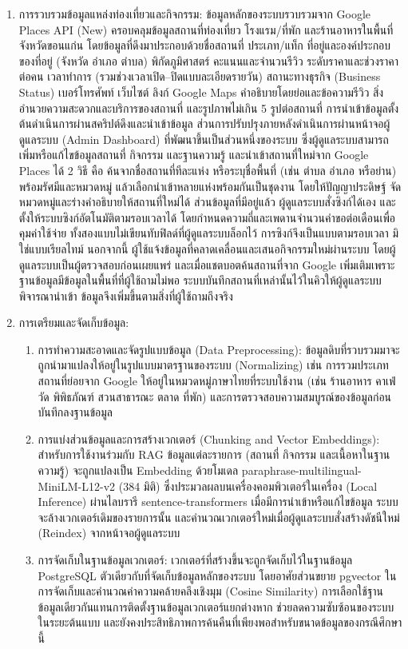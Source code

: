 \begin{enumerate}
\item การรวบรวมข้อมูลแหล่งท่องเที่ยวและกิจกรรม: ข้อมูลหลักของระบบรวบรวมจาก Google Places API (New) ครอบคลุมข้อมูลสถานที่ท่องเที่ยว โรงแรม/ที่พัก และร้านอาหารในพื้นที่จังหวัดขอนแก่น โดยข้อมูลที่ดึงมาประกอบด้วยชื่อสถานที่ ประเภท/แท็ก ที่อยู่และองค์ประกอบของที่อยู่ (จังหวัด อำเภอ ตำบล) พิกัดภูมิศาสตร์ คะแนนและจำนวนรีวิว ระดับราคาและช่วงราคาต่อคน เวลาทำการ (รวมช่วงเวลาเปิด--ปิดแบบละเอียดรายวัน) สถานะทางธุรกิจ (Business Status) เบอร์โทรศัพท์ เว็บไซต์ ลิงก์ Google Maps คำอธิบายโดยย่อและข้อความรีวิว สิ่งอำนวยความสะดวกและบริการของสถานที่ และรูปภาพไม่เกิน 5 รูปต่อสถานที่ การนำเข้าข้อมูลตั้งต้นดำเนินการผ่านสคริปต์ดึงและนำเข้าข้อมูล ส่วนการปรับปรุงภายหลังดำเนินการผ่านหน้าจอผู้ดูแลระบบ (Admin Dashboard) ที่พัฒนาขึ้นเป็นส่วนหนึ่งของระบบ ซึ่งผู้ดูแลระบบสามารถเพิ่มหรือแก้ไขข้อมูลสถานที่ กิจกรรม และฐานความรู้ และนำเข้าสถานที่ใหม่จาก Google Places ได้ 2 วิธี คือ ค้นจากชื่อสถานที่ทีละแห่ง หรือระบุชื่อพื้นที่ (เช่น ตำบล อำเภอ หรือย่าน) พร้อมรัศมีและหมวดหมู่ แล้วเลือกนำเข้าหลายแห่งพร้อมกันเป็นชุดงาน โดยให้ปัญญาประดิษฐ์ จัดหมวดหมู่และร่างคำอธิบายให้สถานที่ใหม่ได้ ส่วนข้อมูลที่มีอยู่แล้ว ผู้ดูแลระบบสั่งซิงก์ได้เอง และตั้งให้ระบบซิงก์อัตโนมัติตามรอบเวลาได้ โดยกำหนดความถี่และเพดานจำนวนคำขอต่อเดือนเพื่อคุมค่าใช้จ่าย ทั้งสองแบบไม่เขียนทับฟิลด์ที่ผู้ดูแลระบบล็อกไว้ การซิงก์จึงเป็นแบบตามรอบเวลา มิใช่แบบเรียลไทม์ นอกจากนี้ ผู้ใช้แจ้งข้อมูลที่คลาดเคลื่อนและเสนอกิจกรรมใหม่ผ่านระบบ โดยผู้ดูแลระบบเป็นผู้ตรวจสอบก่อนเผยแพร่ และเมื่อแชตบอตค้นสถานที่จาก Google เพิ่มเติมเพราะฐานข้อมูลมีข้อมูลในพื้นที่ที่ผู้ใช้ถามไม่พอ ระบบบันทึกสถานที่เหล่านั้นไว้ในคิวให้ผู้ดูแลระบบพิจารณานำเข้า ข้อมูลจึงเพิ่มขึ้นตามสิ่งที่ผู้ใช้ถามถึงจริง
\item การเตรียมและจัดเก็บข้อมูล:
\begin{enumerate}
\item การทำความสะอาดและจัดรูปแบบข้อมูล (Data Preprocessing): ข้อมูลดิบที่รวบรวมมาจะถูกนำมาแปลงให้อยู่ในรูปแบบมาตรฐานของระบบ (Normalizing) เช่น การรวมประเภทสถานที่ย่อยจาก Google ให้อยู่ในหมวดหมู่ภาษาไทยที่ระบบใช้งาน (เช่น ร้านอาหาร คาเฟ่ วัด พิพิธภัณฑ์ สวนสาธารณะ ตลาด ที่พัก) และการตรวจสอบความสมบูรณ์ของข้อมูลก่อนบันทึกลงฐานข้อมูล
\item การแบ่งส่วนข้อมูลและการสร้างเวกเตอร์ (Chunking and Vector Embeddings): สำหรับการใช้งานร่วมกับ RAG ข้อมูลแต่ละรายการ (สถานที่ กิจกรรม และเนื้อหาในฐานความรู้) จะถูกแปลงเป็น Embedding ด้วยโมเดล paraphrase-multilingual-MiniLM-L12-v2 (384 มิติ) ซึ่งประมวลผลบนเครื่องคอมพิวเตอร์ในเครื่อง (Local Inference) ผ่านไลบรารี sentence-transformers เมื่อมีการนำเข้าหรือแก้ไขข้อมูล ระบบจะล้างเวกเตอร์เดิมของรายการนั้น และคำนวณเวกเตอร์ใหม่เมื่อผู้ดูแลระบบสั่งสร้างดัชนีใหม่ (Reindex) จากหน้าจอผู้ดูแลระบบ
\item การจัดเก็บในฐานข้อมูลเวกเตอร์: เวกเตอร์ที่สร้างขึ้นจะถูกจัดเก็บไว้ในฐานข้อมูล PostgreSQL ตัวเดียวกับที่จัดเก็บข้อมูลหลักของระบบ โดยอาศัยส่วนขยาย pgvector ในการจัดเก็บและคำนวณค่าความคล้ายคลึงเชิงมุม (Cosine Similarity) การเลือกใช้ฐานข้อมูลเดียวกันแทนการติดตั้งฐานข้อมูลเวกเตอร์แยกต่างหาก ช่วยลดความซับซ้อนของระบบในระยะต้นแบบ และยังคงประสิทธิภาพการค้นคืนที่เพียงพอสำหรับขนาดข้อมูลของกรณีศึกษานี้
\end{enumerate}
\end{enumerate}

